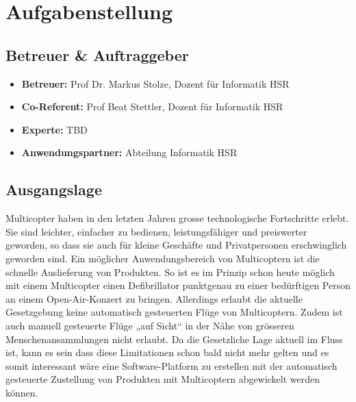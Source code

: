 \newpage
{}
\chapter*{Aufgabenstellung}
\label{cha:aufgabenstellung}

\section*{Betreuer \& Auftraggeber}
\begin{itemize}
	\item{\textbf{Betreuer:} Prof Dr. Markus Stolze, Dozent für Informatik HSR}
	\item{\textbf{Co-Referent:} Prof Beat Stettler, Dozent für Informatik HSR}
	\item{\textbf{Experte:} TBD}
	\item{\textbf{Anwendungspartner:} Abteilung Informatik HSR}		
\end{itemize}

\section*{Ausgangslage}
Multicopter haben in den letzten Jahren grosse technologische Fortschritte erlebt. Sie sind leichter, einfacher zu bedienen, leistungsfähiger und preiswerter geworden, so dass sie auch für kleine Geschäfte und Privatpersonen erschwinglich geworden sind. 
Ein möglicher Anwendungsbereich von Multicoptern ist die schnelle Auslieferung von Produkten. So ist es im Prinzip schon heute möglich mit einem Multicopter einen Defibrillator punktgenau zu einer bedürftigen Person an einem Open-Air-Konzert zu bringen. Allerdings erlaubt die aktuelle Gesetzgebung keine automatisch gesteuerten Flüge von Multicoptern. Zudem ist auch manuell gesteuerte Flüge „auf Sicht“ in der Nähe von grösseren Menschenansammlungen nicht erlaubt. Da die Gesetzliche Lage aktuell im Fluss ist, kann es sein dass diese Limitationen schon bald nicht mehr gelten und es somit interessant wäre eine Software-Platform zu erstellen mit der automatisch gesteuerte Zustellung von Produkten mit Multicoptern abgewickelt werden können.  

